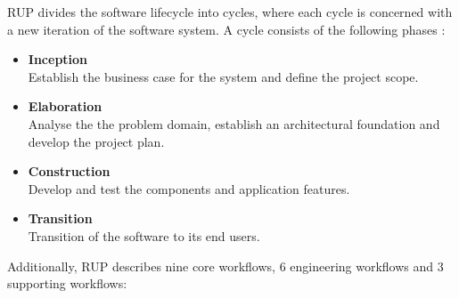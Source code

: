 \ac{RUP} divides the software lifecycle into cycles, where each cycle is concerned with a new iteration of the software system. A cycle consists of the following phases \citep{Kruchten:1996aa}:

\begin{itemize}
	\item \textbf{Inception}\\
	Establish the business case for the system and define the project scope.
	\item \textbf{Elaboration}\\
	Analyse the the problem domain, establish an architectural foundation and develop the project plan.
	\item \textbf{Construction}\\
	Develop and test the components and application features.
	\item \textbf{Transition}\\
	Transition of the software to its end users.
\end{itemize}

Additionally, \ac{RUP} describes nine core workflows, 6 engineering workflows and 3 supporting workflows:

